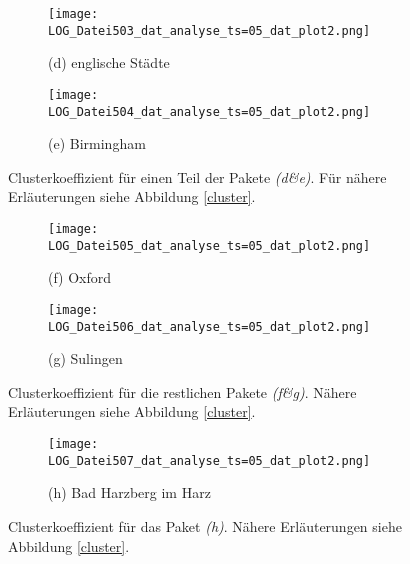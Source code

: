 \documentclass[fontsize=11pt, twoside, a4paper]{scrartcl}
\begin{document}
\begin{figure}
		\begin{minipage}[t]{0.75\textwidth}
		\begin{figure}[H]
		\texttt{[image: LOG\_Datei503\_dat\_analyse\_ts=05\_dat\_plot2.png]}
		\caption*{(d) englische Städte}
		\end{figure}
	\end{minipage}
	\begin{minipage}[t]{0.75\textwidth}
		\begin{figure}[H]
		\texttt{[image: LOG\_Datei504\_dat\_analyse\_ts=05\_dat\_plot2.png]}
		\caption*{(e) Birmingham}
		\end{figure}
	\end{minipage}
\caption{Clusterkoeffizient für einen Teil der Pakete \textit{(d\&e)}. Für nähere Erläuterungen siehe Abbildung \ref{cluster}.}
\end{figure}

\begin{figure}	
		\begin{minipage}[t]{0.75\textwidth}
		\begin{figure}[H]
		\texttt{[image: LOG\_Datei505\_dat\_analyse\_ts=05\_dat\_plot2.png]}
		\caption*{(f) Oxford}
		\end{figure}
	\end{minipage}
	\begin{minipage}[t]{0.75\textwidth}
		\begin{figure}[H]
		\texttt{[image: LOG\_Datei506\_dat\_analyse\_ts=05\_dat\_plot2.png]}
		\caption*{(g) Sulingen}
		\end{figure}
	\end{minipage}
\caption{Clusterkoeffizient für die restlichen Pakete \textit{(f\&g)}. Nähere Erläuterungen siehe Abbildung \ref{cluster}.}
\end{figure}

\begin{figure}
	\begin{minipage}[t]{0.75\textwidth}
		\begin{figure}[H]
		\texttt{[image: LOG\_Datei507\_dat\_analyse\_ts=05\_dat\_plot2.png]}
		\caption*{(h) Bad Harzberg im Harz}
		\end{figure}
	\end{minipage}
\caption{Clusterkoeffizient für das Paket \textit{(h)}. Nähere Erläuterungen siehe Abbildung \ref{cluster}.}
\end{figure}
\end{document}
